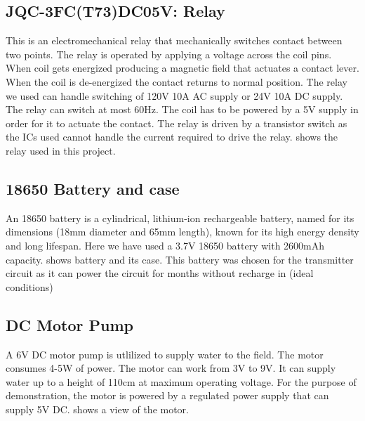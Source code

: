 \subsection{JQC-3FC(T73)DC05V: Relay}


This is an electromechanical relay that mechanically switches contact between two points. The relay is operated by applying a voltage across the coil pins. When coil gets energized producing a magnetic field that actuates a contact lever. When the coil is de-energized the contact returns to normal position. The relay we used can handle switching of 120V 10A AC supply or 24V 10A DC supply. The relay can switch at most 60Hz. The coil has to be powered by a 5V supply in order for it to actuate the contact\cite{jqc}. The relay is driven by a transistor switch as the ICs used cannot handle the current required to drive the relay.  shows the relay used in this project.


\subsection{18650 Battery and case}

An 18650 battery is a cylindrical, lithium-ion rechargeable battery, named for its dimensions (18mm diameter and 65mm length), known for its high energy density and long lifespan. Here we have used a 3.7V 18650 battery with 2600mAh capacity.  shows battery and its case. This battery was chosen for the transmitter circuit as it can power the circuit for months without recharge in (ideal conditions)

\subsection{DC Motor Pump}

A 6V DC motor pump is utlilized to supply water to the field. The motor consumes 4-5W of power. The motor can work from 3V to 9V. It can supply water up to a height of 110cm at maximum operating voltage.\cite{pump} For the purpose of demonstration, the motor is powered by a regulated power supply that can supply 5V DC.  shows a view of the motor.\\

